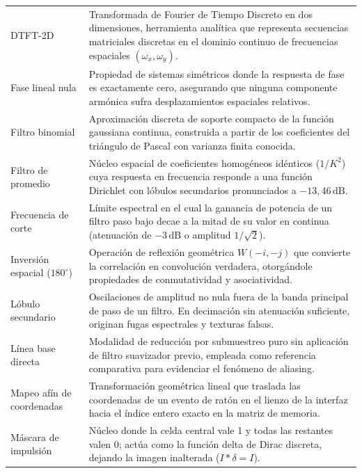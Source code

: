 \documentclass[11pt]{article}
\begin{document}
\begin{longtable}{>{\raggedright\arraybackslash}p{3.8cm}>{\raggedright\arraybackslash}p{10.4cm}}
DTFT-2D & Transformada de Fourier de Tiempo Discreto en dos dimensiones, herramienta analítica que representa secuencias matriciales discretas en el dominio continuo de frecuencias espaciales $(\omega_x, \omega_y)$. \\
\cellcolor{azulClaro!40}Fase lineal nula & \cellcolor{azulClaro!40}Propiedad de sistemas simétricos donde la respuesta de fase es exactamente cero, asegurando que ninguna componente armónica sufra desplazamientos espaciales relativos. \\
Filtro binomial & Aproximación discreta de soporte compacto de la función gaussiana continua, construida a partir de los coeficientes del triángulo de Pascal con varianza finita conocida. \\
\cellcolor{azulClaro!40}Filtro de promedio & \cellcolor{azulClaro!40}Núcleo espacial de coeficientes homogéneos idénticos ($1/K^2$) cuya respuesta en frecuencia responde a una función Dirichlet con lóbulos secundarios pronunciados a $-13,46\,\text{dB}$. \\
Frecuencia de corte & Límite espectral en el cual la ganancia de potencia de un filtro paso bajo decae a la mitad de su valor en continua (atenuación de $-3\,\text{dB}$ o amplitud $1/\sqrt{2}$). \\
\cellcolor{azulClaro!40}Inversión espacial ($180^\circ$) & \cellcolor{azulClaro!40}Operación de reflexión geométrica $W(-i, -j)$ que convierte la correlación en convolución verdadera, otorgándole propiedades de conmutatividad y asociatividad. \\
Lóbulo secundario & Oscilaciones de amplitud no nula fuera de la banda principal de paso de un filtro. En decimación sin atenuación suficiente, originan fugas espectrales y texturas falsas. \\
\cellcolor{azulClaro!40}Línea base directa & \cellcolor{azulClaro!40}Modalidad de reducción por submuestreo puro sin aplicación de filtro suavizador previo, empleada como referencia comparativa para evidenciar el fenómeno de aliasing. \\
Mapeo afín de coordenadas & Transformación geométrica lineal que traslada las coordenadas de un evento de ratón en el lienzo de la interfaz hacia el índice entero exacto en la matriz de memoria. \\
\cellcolor{azulClaro!40}Máscara de impulsión & \cellcolor{azulClaro!40}Núcleo donde la celda central vale 1 y todas las restantes valen 0; actúa como la función delta de Dirac discreta, dejando la imagen inalterada ($I * \delta = I$). \\

\end{longtable}
\end{document}
